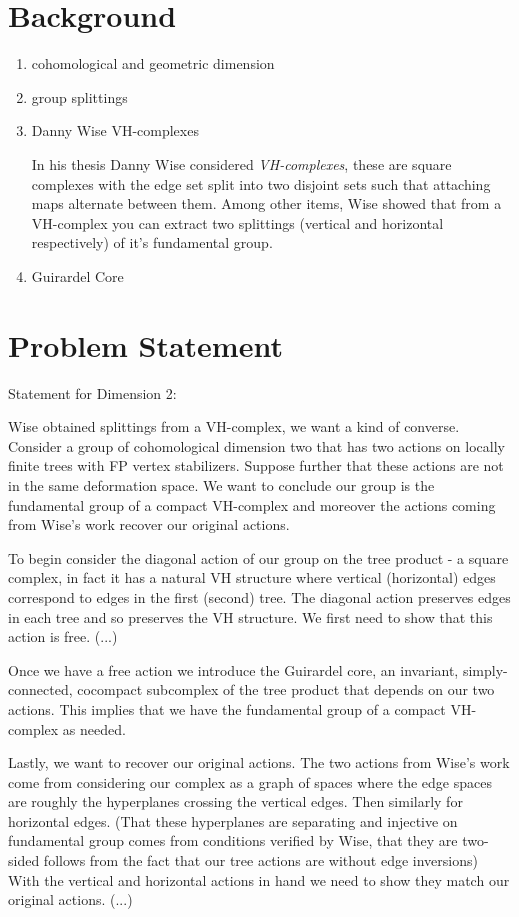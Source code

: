 \documentclass{article}
\theoremstyle{mystyle}
\theoremstyle{remark}
\begin{document}
\section{Background}

\begin{enumerate}
    \item cohomological and geometric dimension
    \item group splittings
    \item Danny Wise VH-complexes
    
        In his thesis Danny Wise considered {\em VH-complexes}, these are square complexes with the edge set split into two disjoint sets such that attaching maps alternate between them. Among other items, Wise showed that from a VH-complex you can extract two splittings (vertical and horizontal respectively) of it's fundamental group.
    \item Guirardel Core
\end{enumerate}

\section{Problem Statement}

Statement for Dimension 2: 

Wise obtained splittings from a VH-complex, we want a kind of converse. Consider a group of cohomological dimension two that has two actions on locally finite trees with FP vertex stabilizers. Suppose further that these actions are not in the same deformation space. We want to conclude our group is the fundamental group of a compact VH-complex and moreover the actions coming from Wise's work recover our original actions.

To begin consider the diagonal action of our group on the tree product - a square complex, in fact it has a natural VH structure where vertical (horizontal) edges correspond to edges in the first (second) tree. The diagonal action preserves edges in each tree and so preserves the VH structure. We first need to show that this action is free. (...)

Once we have a free action we introduce the Guirardel core, an invariant, simply-connected, cocompact subcomplex of the tree product that depends on our two actions. This implies that we have the fundamental group of a compact VH-complex as needed.

Lastly, we want to recover our original actions. The two actions from Wise's work come from considering our complex as a graph of spaces where the edge spaces are roughly the hyperplanes crossing the vertical edges. Then similarly for horizontal edges. (That these hyperplanes are separating and injective on fundamental group comes from conditions verified by Wise, that they are two-sided follows from the fact that our tree actions are without edge inversions) With the vertical and horizontal actions in hand we need to show they match our original actions. (...)
\end{document}
